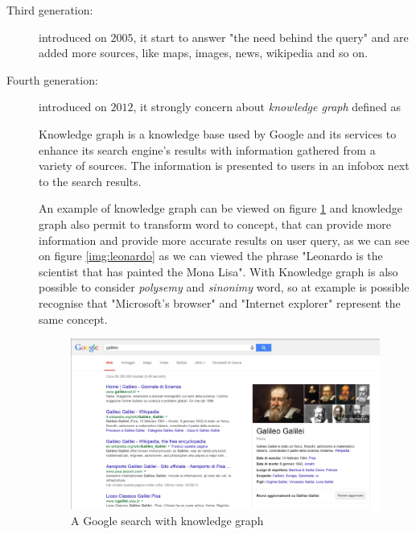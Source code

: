 \begin{description}
\begin{figure}
                                \end{figure}
    \item [Third generation: ] introduced on $2005$, it start to answer "the need behind the query" and are
                               added more sources, like maps, images, news, wikipedia and so on. 

    \item [Fourth generation: ] introduced on $2012$, it strongly concern about \emph{knowledge graph} defined as
                                \begin{defi}
                                Knowledge graph is a knowledge base used by Google and its services to enhance
                                its search engine's results with information gathered from a variety of sources.\newline
                                The information is presented to users in an infobox next to the search results.
                                \end{defi}
                                An example of knowledge graph can be viewed on figure \ref{img:knowledgeGraph} and
                                knowledge graph also permit to transform word to concept, that can provide more
                                information and provide more accurate results on user query, as we can see on 
                                figure \ref{img:leonardo} as we can viewed the phrase "Leonardo is the scientist
                                that has painted the Mona Lisa". \newline
                                With Knowledge graph is also possible to consider \emph{polysemy} and 
                                \emph{sinonimy} word, so at example is possible recognise that "Microsoft's browser"
                                and "Internet explorer" represent the same concept.
                                \begin{figure}
                                    \caption{A Google search with knowledge graph}
                                    \label{img:knowledgeGraph}
                                    \includegraphics[width=\textwidth]{Images/knowledgeGraph}

\end{figure}
\end{description}
